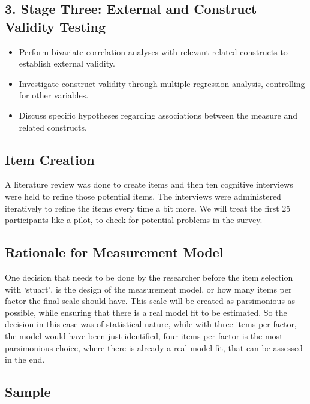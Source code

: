 \documentclass[
  12pt,
  a4paper,
  twoside]{article}
\providecommand{\tightlist}{%
  \setlength{\itemsep}{0pt}\setlength{\parskip}{0pt}}
\begin{document}
\subsection{3. Stage Three: External and Construct Validity Testing}\label{stage-three-external-and-construct-validity-testing}

\begin{itemize}
\tightlist
\item
  Perform bivariate correlation analyses with relevant related constructs to establish external validity.
\item
  Investigate construct validity through multiple regression analysis, controlling for other variables.
\item
  Discuss specific hypotheses regarding associations between the measure and related constructs.
\end{itemize}

\subsection{Item Creation}\label{item-creation}

A literature review was done to create items and then ten cognitive interviews were held to refine those potential items. The interviews were administered iteratively to refine the items every time a bit more. We will treat the first 25 participants like a pilot, to check for potential problems in the survey.

\subsection{Rationale for Measurement Model}\label{rationale-for-measurement-model}

One decision that needs to be done by the researcher before the item selection with `stuart', is the design of the measurement model, or how many items per factor the final scale should have.
This scale will be created as parsimonious as possible, while ensuring that there is a real model fit to be estimated. So the decision in this case was of statistical nature, while with three items per factor, the model would have been just identified, four items per factor is the most parsimonious choice, where there is already a real model fit, that can be assessed in the end.

\subsection{Sample}\label{sample}
\end{document}
